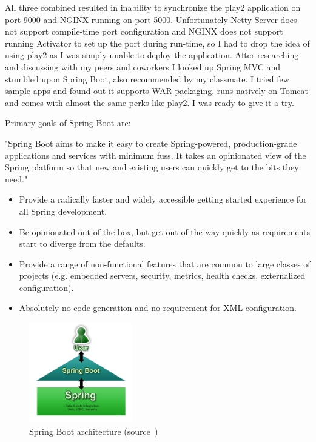 All three combined resulted in inability to synchronize the play2 application on port 9000 and NGINX running on port 5000. Unfortunately Netty Server does not support compile-time port configuration and NGINX does not support running Activator to set up the port during run-time, so I had to drop the idea of using play2 as I was simply unable to deploy the application. After researching and discussing with my peers and coworkers I looked up Spring MVC and stumbled upon Spring Boot, also recommended by my classmate. I tried few sample apps and found out it supports WAR packaging, runs natively on Tomcat and comes with almost the same perks like play2. I was ready to give it a try.

Primary goals of Spring Boot are:

"Spring Boot aims to make it easy to create Spring-powered, production-grade applications and services with minimum fuss. It takes an opinionated view of the Spring platform so that new and existing users can quickly get to the bits they need." \cite{spring-boot-blog}

\begin{itemize}
	\item Provide a radically faster and widely accessible getting started experience for all Spring development.
	\item Be opinionated out of the box, but get out of the way quickly as requirements start to diverge from the defaults.
	\item Provide a range of non-functional features that are common to large classes of projects (e.g. embedded servers, security, metrics, health checks, externalized configuration).
	\item Absolutely no code generation and no requirement for XML configuration.
\end{itemize}

\begin{figure}[!ht]
	\centering
	\includegraphics[width=0.4\textwidth]{figures/04_implementation/spring}
    \caption[Spring Boot architecture]{Spring Boot architecture (source~\protect\cite{spring-boot-doc})}
\end{figure}

